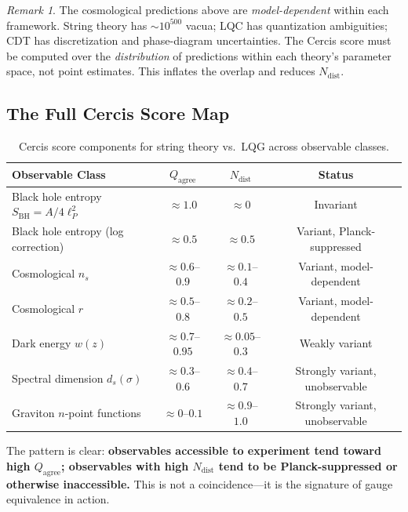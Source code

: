 \documentclass[12pt,a4paper]{article}
\theoremstyle{remark}
\newtheorem{remark}[theorem]{Remark}
\newcommand{\Cercis}{\textsf{Cercis}}
\begin{document}
\begin{remark}
\label{rem:cosmo_caveat}
The cosmological predictions above are \emph{model-dependent} within each framework. String theory has $\sim 10^{500}$ vacua; LQC has quantization ambiguities; CDT has discretization and phase-diagram uncertainties. The \Cercis{} score must be computed over the \emph{distribution} of predictions within each theory's parameter space, not point estimates. This inflates the overlap and reduces $N_{\text{dist}}$.
\end{remark}

\subsection{The Full Cercis Score Map}

\begin{table}[H]
\centering
\caption{\Cercis{} score components for string theory vs.\ LQG across observable classes.}
\label{tab:cercis_map}
\begin{tabular}{@{}lccc@{}}
\toprule
\textbf{Observable Class} & $Q_{\text{agree}}$ & $N_{\text{dist}}$ & \textbf{Status} \\
\midrule
Black hole entropy $S_{\text{BH}} = A/4\ell_P^2$ & $\approx 1.0$ & $\approx 0$ & Invariant \\
Black hole entropy (log correction) & $\approx 0.5$ & $\approx 0.5$ & Variant, Planck-suppressed \\
Cosmological $n_s$ & $\approx 0.6$--$0.9$ & $\approx 0.1$--$0.4$ & Variant, model-dependent \\
Cosmological $r$ & $\approx 0.5$--$0.8$ & $\approx 0.2$--$0.5$ & Variant, model-dependent \\
Dark energy $w(z)$ & $\approx 0.7$--$0.95$ & $\approx 0.05$--$0.3$ & Weakly variant \\
Spectral dimension $d_s(\sigma)$ & $\approx 0.3$--$0.6$ & $\approx 0.4$--$0.7$ & Strongly variant, unobservable \\
Graviton $n$-point functions & $\approx 0$--$0.1$ & $\approx 0.9$--$1.0$ & Strongly variant, unobservable \\
\bottomrule
\end{tabular}
\end{table}

The pattern is clear: \textbf{observables accessible to experiment tend toward high $Q_{\text{agree}}$; observables with high $N_{\text{dist}}$ tend to be Planck-suppressed or otherwise inaccessible.} This is not a coincidence---it is the signature of gauge equivalence in action.
\end{document}
